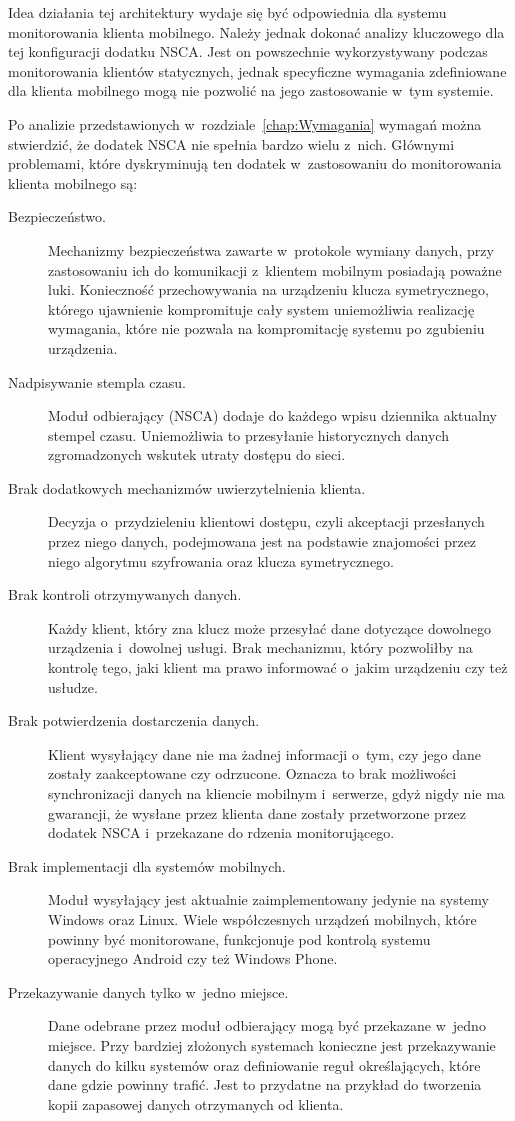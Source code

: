 Idea działania tej architektury wydaje się być odpowiednia dla systemu
monitorowania klienta mobilnego. Należy jednak dokonać analizy
kluczowego dla tej konfiguracji dodatku NSCA. Jest on powszechnie
wykorzystywany podczas monitorowania klientów statycznych, jednak
specyficzne wymagania zdefiniowane dla klienta mobilnego mogą nie
pozwolić na jego zastosowanie w~tym systemie.

Po analizie przedstawionych w~rozdziale~\ref{chap:Wymagania} wymagań
można stwierdzić, że dodatek NSCA nie spełnia bardzo wielu
z~nich. Głównymi problemami, które dyskryminują ten dodatek
w~zastosowaniu do monitorowania klienta mobilnego są:

\begin{description}
\item[Bezpieczeństwo.] Mechanizmy bezpieczeństwa zawarte w~protokole
  wymiany danych, przy zastosowaniu ich do komunikacji z~klientem
  mobilnym posiadają poważne luki. Konieczność przechowywania na
  urządzeniu klucza symetrycznego, którego ujawnienie kompromituje
  cały system uniemożliwia realizację wymagania, które nie pozwala na
  kompromitację systemu po zgubieniu urządzenia.
\item[Nadpisywanie stempla czasu.] Moduł odbierający (NSCA) dodaje do
  każdego wpisu dziennika aktualny stempel czasu. Uniemożliwia to
  przesyłanie historycznych danych zgromadzonych wskutek utraty
  dostępu do sieci.
\item[Brak dodatkowych mechanizmów uwierzytelnienia klienta.] Decyzja
  o~przydzieleniu klientowi dostępu, czyli akceptacji przesłanych
  przez niego danych, podejmowana jest na podstawie znajomości przez
  niego algorytmu szyfrowania oraz klucza symetrycznego.
\item[Brak kontroli otrzymywanych danych.] Każdy klient, który zna
  klucz może przesyłać dane dotyczące dowolnego urządzenia i~dowolnej
  usługi. Brak mechanizmu, który pozwoliłby na kontrolę tego, jaki
  klient ma prawo informować o~jakim urządzeniu czy też usłudze.
\item[Brak potwierdzenia dostarczenia danych.] Klient wysyłający dane
  nie ma żadnej informacji o~tym, czy jego dane zostały zaakceptowane
  czy odrzucone. Oznacza to brak możliwości synchronizacji danych na
  kliencie mobilnym i~serwerze, gdyż nigdy nie ma gwarancji, że
  wysłane przez klienta dane zostały przetworzone przez dodatek NSCA
  i~przekazane do rdzenia monitorującego.
\item[Brak implementacji dla systemów mobilnych.] Moduł wysyłający
  jest aktualnie zaimplementowany jedynie na systemy Windows oraz
  Linux. Wiele współczesnych urządzeń mobilnych, które powinny być
  monitorowane, funkcjonuje pod kontrolą systemu operacyjnego Android
  czy też Windows Phone.
\item[Przekazywanie danych tylko w~jedno miejsce.] Dane odebrane przez
  moduł odbierający mogą być przekazane w~jedno miejsce. Przy bardziej
  złożonych systemach konieczne jest przekazywanie danych do kilku
  systemów oraz definiowanie reguł określających, które dane gdzie
  powinny trafić. Jest to przydatne na przykład do tworzenia kopii
  zapasowej danych otrzymanych od klienta.
\end{description}

